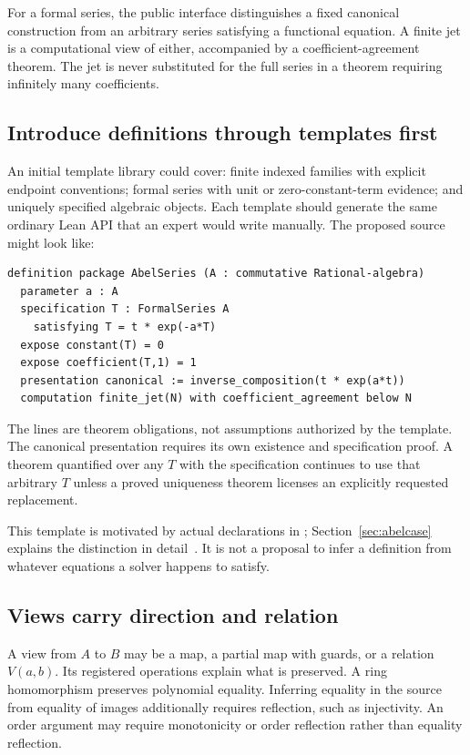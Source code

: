 \documentclass[11pt,a4paper]{article}
\newcommand{\code}[1]{\texttt{\detokenize{#1}}}
\theoremstyle{remark}\newtheorem{example}[proposition]{Example}
\begin{document}
For a formal series, the public interface distinguishes a fixed canonical construction from an arbitrary series satisfying a functional equation. A finite jet is a computational view of either, accompanied by a coefficient-agreement theorem. The jet is never substituted for the full series in a theorem requiring infinitely many coefficients.

\subsection{Introduce definitions through templates first}
An initial template library could cover: finite indexed families with explicit endpoint conventions; formal series with unit or zero-constant-term evidence; and uniquely specified algebraic objects. Each template should generate the same ordinary Lean API that an expert would write manually. The proposed source might look like:
\begin{lstlisting}
definition package AbelSeries (A : commutative Rational-algebra)
  parameter a : A
  specification T : FormalSeries A
    satisfying T = t * exp(-a*T)
  expose constant(T) = 0
  expose coefficient(T,1) = 1
  presentation canonical := inverse_composition(t * exp(a*t))
  computation finite_jet(N) with coefficient_agreement below N
\end{lstlisting}
The \code{expose} lines are theorem obligations, not assumptions authorized by the template. The canonical presentation requires its own existence and specification proof. A theorem quantified over any $T$ with the specification continues to use that arbitrary $T$ unless a proved uniqueness theorem licenses an explicitly requested replacement.

This template is motivated by actual declarations in ; Section~\ref{sec:abelcase} explains the distinction in detail~\cite{abel}. It is not a proposal to infer a definition from whatever equations a solver happens to satisfy.

\subsection{Views carry direction and relation}
A view from $A$ to $B$ may be a map, a partial map with guards, or a relation $V(a,b)$. Its registered operations explain what is preserved. A ring homomorphism preserves polynomial equality. Inferring equality in the source from equality of images additionally requires reflection, such as injectivity. An order argument may require monotonicity or order reflection rather than equality reflection.
\end{document}
